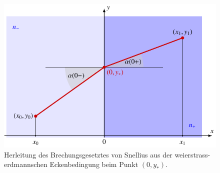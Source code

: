%
%
%
\begin{figure}
\centering
\includegraphics{chapters/030-nichtdiff/images/brechung.pdf}
\caption{Herleitung des Brechungsgesetztes von Snellius aus
der weierstrass-erdmannschen Eckenbedingung beim Punkt $(0,y_*)$.
\label{buch:nichtdiff:fig:brechung}}
\end{figure}
